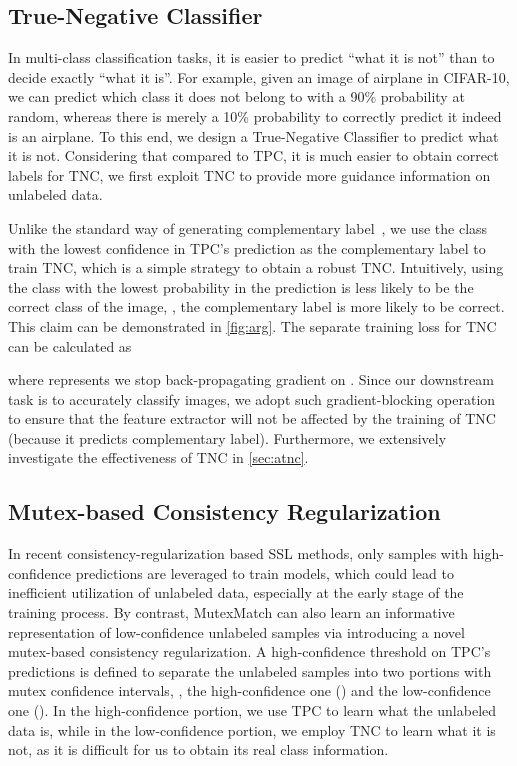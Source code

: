 \documentclass[lettersize,journal]{IEEEtran}
\theoremstyle{plain}
\theoremstyle{definition}
\theoremstyle{remark}
\begin{document}
\subsection{True-Negative Classifier}
\label{tnc_section}
In multi-class classification tasks, it is easier to predict ``what it is not'' than to decide exactly ``what it is''. For example, given an image of airplane in CIFAR-10, we can predict which class it does not belong to with a 90\% probability  at random, whereas there is merely a 10\% probability  to correctly predict it indeed is an airplane. To this end, we design a True-Negative Classifier to predict what it is not. Considering that compared to TPC, it is much easier to obtain correct labels for TNC, 
we first exploit TNC to provide more guidance information on unlabeled data. 


Unlike the standard way of generating complementary label~\cite{ishida2017learning,yu2018learning}, we use the class with the lowest confidence in TPC's prediction as the complementary label to train TNC, which is a simple strategy to obtain a robust TNC. Intuitively, using the class with the lowest probability in the prediction is less likely to be the correct class of the image, \ie, the complementary label is more likely to be correct. This claim can be demonstrated in \cref{fig:arg}.
The separate training loss  for TNC can be calculated as

where  represents we stop back-propagating gradient on . Since our downstream task is to accurately classify images, 
we adopt such gradient-blocking operation to ensure that the feature extractor will not be affected by the training of TNC (because it predicts complementary label). Furthermore, we extensively investigate the effectiveness of TNC in \cref{sec:atnc}.


\nobalance


\subsection{Mutex-based Consistency Regularization}
\label{cos_section}
In recent consistency-regularization based SSL methods, only samples with high-confidence predictions are leveraged to train models, which  could lead to inefficient utilization of unlabeled data, especially at the early stage of the training process. By contrast, MutexMatch can also learn an informative representation of low-confidence unlabeled samples via introducing a novel mutex-based consistency regularization. A high-confidence threshold  on TPC's predictions is defined to separate the unlabeled samples into two portions with mutex confidence intervals, \ie, the high-confidence one () and the low-confidence one (). In the high-confidence portion, we use TPC to learn what the unlabeled data is, while in the low-confidence portion, we employ TNC to learn what it is not, as it is difficult for us to obtain its real class information. 
\end{document}
